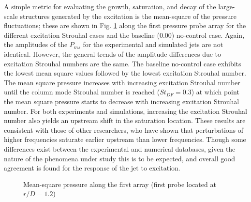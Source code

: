 \documentclass[english]{aiaa-tc}
\begin{document}
A simple metric for evaluating the growth, saturation, and decay of the large-scale structures generated by the excitation is the mean-square of the pressure fluctuations; these are shown in Fig. \ref{pms} along the first pressure probe array for the different excitation Strouhal cases and the baseline (0.00) no-control case. Again, the amplitudes of the $P_{ms}$ for the experimental and simulated jets are not identical. However, the general trends of the amplitude differences due to excitation Strouhal numbers are the same. The baseline no-control case exhibits the lowest mean square values followed by the lowest excitation Strouhal number. The mean square pressure increases with increasing excitation Strouhal number until the column mode Strouhal number is reached ($St_{DF}=0.3$) at which point the mean square pressure starts to decrease with increasing excitation Strouhal number. For both experiments and simulations, increasing the excitation Strouhal number also yields an upstream shift in the saturation location. These results are consistent with those of other researchers, who have shown that perturbations of higher frequencies saturate earlier upstream than lower frequencies\cite{Suzuki2006,Ukeiley2004}. Though some differences exist between the experimental and numerical databases, given the nature of the phenomena under study this is to be expected, and overall good agreement is found for the response of the jet to excitation. 
 
\begin{figure}
\centering{}
\caption{Mean-square pressure along the first array (first probe located at $r/D=1.2$)}\label{pms}
\end{figure}
\end{document}
